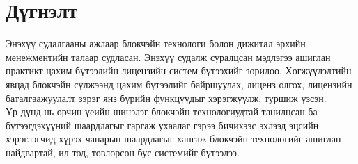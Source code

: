 \chapter{Дүгнэлт}
Энэхүү судалгааны ажлаар блокчэйн технологи болон дижитал эрхийн менежментийн талаар судласан. Энэхүү судалж суралцсан мэдлэгээ ашиглан практикт цахим бүтээлийн лицензийн систем бүтээхийг зорилоо. Хөгжүүлэлтийн явцад блокчэйн сүлжээнд цахим бүтээлийг байршуулах, лиценз олгох, лицензийн баталгаажуулалт зэрэг янз бүрийн функцүүдыг хэрэгжүүлж, туршиж үзсэн.
\\
Үр дүнд нь орчин үеийн шинэлэг блокчэйн технологиудтай танилцсан ба бүтээгдэхүүний шаардлагыг гаргаж ухаалаг гэрээ бичихээс эхлээд эцсийн хэрэглэгчид хүрэх чанарын шаардлагыг хангаж блокчэйн технологийг ашиглан найдвартай, ил тод, төвлөрсөн бус системийг бүтээлээ.